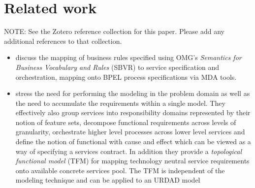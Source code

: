 \section{Related work \label{sec:relatedWork}}

NOTE: See the Zotero reference collection for this paper. Please add any additional references to that collection.

\begin{itemize}
 \item \cite{iacob_model-driven_2008} discuss the mapping of business rules specified using OMG's {\em Semantics for Business Vocabulary and Rules} (SBVR) to service specification and orchestration, mapping onto BPEL process specifications via MDA tools.

  \item \cite{asnina_computation_2010} stress the need for performing the modeling in the problem domain as well as the need to accumulate the requirements within a single model. They effectively also group services into responsibility domains represented by their notion of feature sets, decompose functional requirements across levels of granularity, orchestrate higher level processes across lower level services and define the notion of functional with cause and effect which can be viewed as a way of specifying a services contract. In addition they provide a {\em topological functional model} (TFM) for mapping technology neutral service requirements onto available concrete services pool. The TFM is independent of the modeling technique and can be applied to an URDAD model






\end{itemize}
